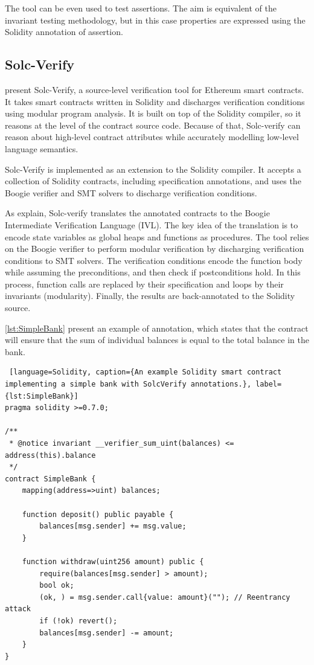 The tool can be even used to test assertions. 
The aim is equivalent of the invariant testing methodology, 
but in this case properties are expressed using the Solidity annotation of assertion. 

\subsection{Solc-Verify}
\label{sec:Specification:Solc-Verify}

\citet{SolcVerify} present Solc-Verify, a source-level verification tool for
Ethereum smart contracts. It takes smart contracts written
in Solidity and discharges verification conditions using modular program
analysis. It is built on top of the Solidity compiler, so it reasons at the level of the contract source code. 
Because of that, Solc-verify can reason about high-level contract attributes 
while accurately modelling low-level language semantics.

Solc-Verify is implemented as an extension to the Solidity compiler.
It accepts a collection of Solidity contracts, including specification annotations, and uses 
the Boogie verifier and SMT solvers to discharge verification conditions. 

As \citet{SolcVerify_2} explain, Solc-verify translates the annotated contracts to the Boogie Intermediate Verification
Language (IVL). The key idea of the translation is to encode state variables as global heaps
and functions as procedures. The tool relies on the Boogie verifier to perform modular
verification by discharging verification conditions to SMT solvers. The verification conditions
encode the function body while assuming the preconditions, and then check if postconditions
hold. In this process, function calls are replaced by their specification and loops by their
invariants (modularity). Finally, the results are back-annotated to the Solidity source.

\autoref{lst:SimpleBank} present an example of annotation, which states that the contract will ensure
that the sum of individual balances is equal to the total balance in the bank.


\begin{lstlisting} [language=Solidity, caption={An example Solidity smart contract implementing a simple bank with SolcVerify annotations.}, label={lst:SimpleBank}]
pragma solidity >=0.7.0;

/**
 * @notice invariant __verifier_sum_uint(balances) <= address(this).balance
 */
contract SimpleBank {
    mapping(address=>uint) balances;

    function deposit() public payable {
        balances[msg.sender] += msg.value;
    }

    function withdraw(uint256 amount) public {
        require(balances[msg.sender] > amount);
        bool ok;
        (ok, ) = msg.sender.call{value: amount}(""); // Reentrancy attack
        if (!ok) revert();
        balances[msg.sender] -= amount;
    }
}
\end{lstlisting}

